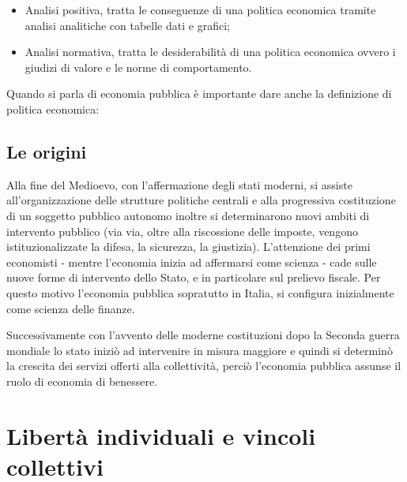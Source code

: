 \documentclass{report}
\begin{document}
\begin{itemize}
  \item Analisi positiva, tratta le conseguenze di una politica economica tramite analisi analitiche con tabelle dati e grafici;
  \item Analisi normativa, tratta le desiderabilità di una politica economica ovvero i giudizi di valore e le norme di comportamento.
\end{itemize}

Quando si parla di economia pubblica è importante dare anche la definizione di politica economica:

\subsection{Le origini}

Alla fine del Medioevo, con l'affermazione degli stati moderni, si assiste all'organizzazione delle strutture politiche centrali e alla progressiva costituzione di un soggetto pubblico autonomo inoltre si determinarono nuovi ambiti di intervento pubblico (via via, oltre alla riscossione delle imposte, vengono istituzionalizzate la difesa, la sicurezza, la giustizia).
L'attenzione dei primi economisti - mentre l'economia inizia ad affermarsi come scienza - cade sulle nuove forme di intervento dello Stato, e in particolare sul prelievo fiscale. Per questo motivo l'economia pubblica sopratutto in Italia, si configura inizialmente come scienza delle finanze.

Successivamente con l'avvento delle moderne costituzioni dopo la Seconda guerra mondiale lo stato iniziò ad intervenire in misura maggiore e quindi si determinò la crescita dei servizi offerti alla collettività, perciò l'economia pubblica assunse il ruolo di economia di benessere.

\section{Libertà individuali e vincoli collettivi}
\end{document}
